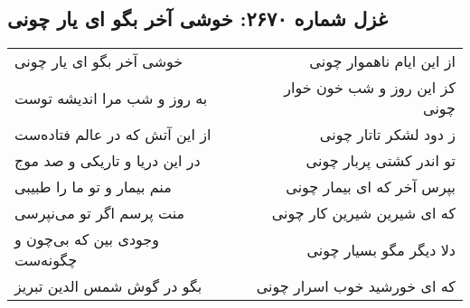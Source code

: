 \begin{center}
\section*{غزل شماره ۲۶۷۰: خوشی آخر بگو ای یار چونی}
\label{sec:2670}
\begin{longtable}{l p{0.5cm} r}
خوشی آخر بگو ای یار چونی
&&
از این ایام ناهموار چونی
\\
به روز و شب مرا اندیشه توست
&&
کز این روز و شب خون خوار چونی
\\
از این آتش که در عالم فتاده‌ست
&&
ز دود لشکر تاتار چونی
\\
در این دریا و تاریکی و صد موج
&&
تو اندر کشتی پربار چونی
\\
منم بیمار و تو ما را طبیبی
&&
بپرس آخر که ای بیمار چونی
\\
منت پرسم اگر تو می‌نپرسی
&&
که ای شیرین شیرین کار چونی
\\
وجودی بین که بی‌چون و چگونه‌ست
&&
دلا دیگر مگو بسیار چونی
\\
بگو در گوش شمس الدین تبریز
&&
که ای خورشید خوب اسرار چونی
\\
\end{longtable}
\end{center}
